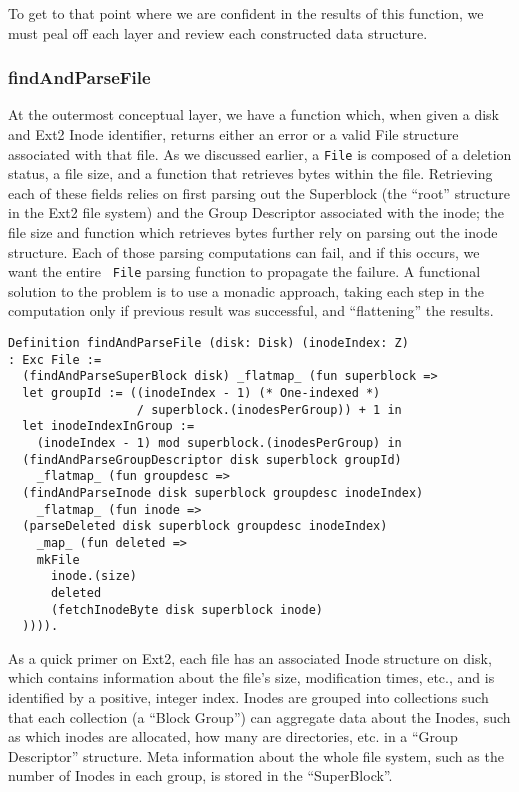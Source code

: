 \documentclass[nocopyrightspace]{sigplanconf}
\begin{document}
To get to that point where we are confident in the results of this function,
we must peal off each layer and review each constructed data structure.

\subsubsection{findAndParseFile}

At the outermost conceptual layer, we have a function which, when given a disk
and Ext2 Inode identifier, returns either an error or a valid File structure
associated with that file. As we discussed earlier, a {\tt File} is composed
of a deletion status, a file size, and a function that retrieves bytes within
the file. Retrieving each of these fields relies on first parsing out the
Superblock (the ``root'' structure in the Ext2 file system) and the Group
Descriptor associated with the inode; the file size and function which
retrieves bytes further rely on parsing out the inode structure. Each of those
parsing computations can fail, and if this occurs, we want the entire {\tt
File} parsing function to propagate the failure. A functional solution to the
problem is to use a monadic approach, taking each step in the computation only
if previous result was successful, and ``flattening'' the results. 

\begin{lstlisting}
Definition findAndParseFile (disk: Disk) (inodeIndex: Z) 
: Exc File :=
  (findAndParseSuperBlock disk) _flatmap_ (fun superblock =>
  let groupId := ((inodeIndex - 1) (* One-indexed *)
                  / superblock.(inodesPerGroup)) + 1 in
  let inodeIndexInGroup := 
    (inodeIndex - 1) mod superblock.(inodesPerGroup) in
  (findAndParseGroupDescriptor disk superblock groupId) 
    _flatmap_ (fun groupdesc =>
  (findAndParseInode disk superblock groupdesc inodeIndex) 
    _flatmap_ (fun inode =>
  (parseDeleted disk superblock groupdesc inodeIndex) 
    _map_ (fun deleted =>
    mkFile
      inode.(size)
      deleted
      (fetchInodeByte disk superblock inode)
  )))).
\end{lstlisting}

As a quick primer on Ext2, each file has an associated Inode structure on
disk, which contains information about the file's size, modification times,
etc., and is identified by a positive, integer index. Inodes are grouped into
collections such that each collection (a ``Block Group'') can aggregate data
about the Inodes, such as which inodes are allocated, how many are
directories, etc. in a ``Group Descriptor'' structure. Meta information about
the whole file system, such as the number of Inodes in each group, is stored
in the ``SuperBlock''.
\end{document}
